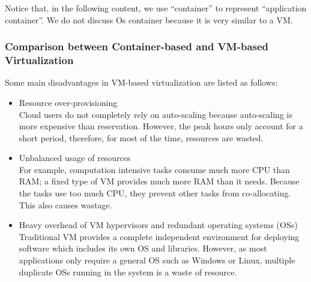 Notice that, in the following content, we use ``container'' to represent ``application container''. 
We do not discuss Os container because it is very similar to a VM.


\subsubsection{Comparison between Container-based and VM-based Virtualization} 
\label{sec:comparison_container_vm}


Some main disadvantages in VM-based virtualization are listed as follows:
\begin{itemize}
	\item Resource over-provisioning \\
	 Cloud users do not completely rely on auto-scaling because auto-scaling is more expensive than reservation. However, the peak hours only account for a short period, therefore, for most of the time, resources are wasted.

	\item Unbalanced usage of resources \\
	For example, computation intensive tasks consume much more CPU than RAM; a fixed type of VM provides much more RAM than it needs. Because the tasks use too much CPU, they prevent other tasks from co-allocating. This also causes wastage.

	\item Heavy overhead of VM hypervisors and redundant operating systems (OSs) \\
	 Traditional VM provides a complete independent environment for deploying software which includes its own OS and libraries. However, as most applications only require a general OS such as Windows or Linux, multiple duplicate OSs running in the system is a waste of resource.
\end{itemize}


